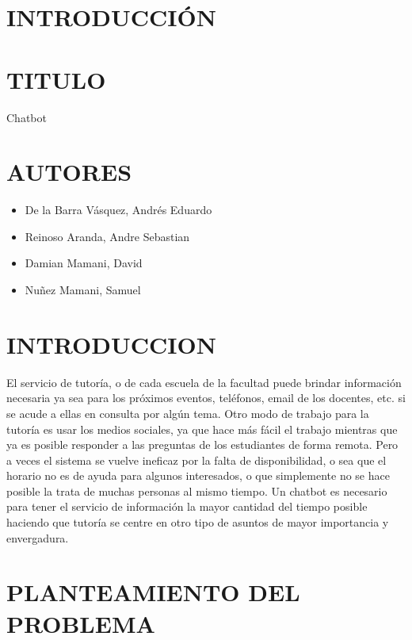 \documentclass[12pt,letterpaper]{article}
\begin{document}
\section{INTRODUCCIÓN} 



\newpage
\section{TITULO}
	\par Chatbot
\section{AUTORES}

\begin{itemize}
	\item De la Barra Vásquez, Andrés Eduardo
	\item Reinoso Aranda, Andre Sebastian
	\item Damian Mamani, David
	\item Nuñez Mamani, Samuel
	
\end{itemize}


\section{INTRODUCCION}
El servicio de tutoría, o de cada escuela de la facultad puede brindar información necesaria ya sea para los próximos eventos, teléfonos, email de los docentes, etc. si se acude a ellas en consulta por algún tema. 
Otro modo de trabajo para la tutoría es usar los medios sociales, ya que hace más fácil el trabajo mientras que ya es posible responder a las preguntas de los estudiantes de forma remota. 
Pero a veces el sistema se vuelve ineficaz por la falta de disponibilidad, o sea que el horario no es de ayuda para algunos interesados, o que simplemente no se hace posible la trata de muchas personas al mismo tiempo.
Un chatbot es necesario para tener el servicio de información la mayor cantidad del tiempo posible haciendo que tutoría se centre en otro tipo de asuntos de mayor importancia y envergadura. 

\section{PLANTEAMIENTO DEL PROBLEMA}
\end{document}
